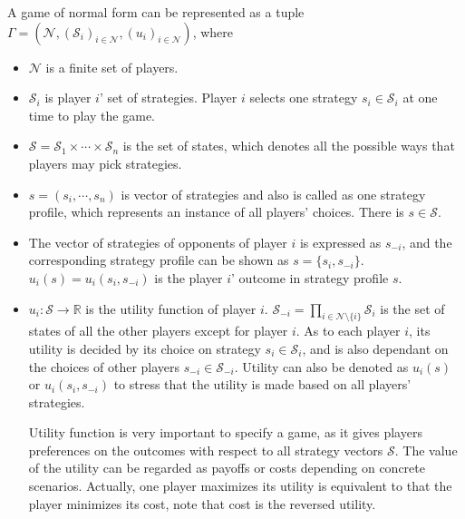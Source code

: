 A game of normal form can be represented as a tuple $\Gamma = (\mathcal{N}, (\mathcal{S}_i)_{i \in \mathcal{N}}, (u_i)_{i\in \mathcal{N}})$, where 
\begin{itemize}
\item $\mathcal{N}$ is a finite set of players.
\item $\mathcal{S}_i$ is player $i$' set of strategies.
Player $i$ selects one strategy $s_i\in \mathcal{S}_i$ at one time to play the game.
\item $\mathcal{S} = \mathcal{S}_1\times\cdots\times \mathcal{S}_n$ is the set of states, which denotes all the possible ways that players may pick strategies.

\item $s=(s_i,\cdots,s_n)$ is vector of strategies and also is called as one strategy profile, which represents an instance of all players' choices.
There is $s\in \mathcal{S}$.

\item The vector of strategies of opponents of player $i$ is expressed as $s_{-i}$, and the corresponding strategy profile can be shown as $s=\{s_i, s_{-i}\}$.
$u_i(s) = u_i(s_i, s_{-i})$ is the player $i$' outcome in strategy profile $s$.

\item $u_i:\mathcal{S}\rightarrow \mathbb{R} $ is the utility function of player $i$.
$\mathcal{S}_{-i}=\prod_{i\in \mathcal{N}\setminus \{i\}}\mathcal{S}_i$ is the set of states of all the other players except for player $i$.
As to each player $i$, its utility is decided by its choice on strategy $s_i\in \mathcal{S}_i$, and is also dependant on the choices of other players $s_{-i}\in \mathcal{S}_{-i}$.
Utility can also be denoted as $u_i(s)$ or $u_i(s_i,s_{-i})$ to stress that the utility is made based on all players' strategies.


Utility function is very important to specify a game, as it gives players preferences on the outcomes with respect to all strategy vectors $\mathcal{S}$.
The value of the utility can be regarded as payoffs or costs depending on concrete scenarios.
Actually, one player maximizes its utility is equivalent to that the player minimizes its cost, note that cost is the reversed utility.
\end{itemize}





